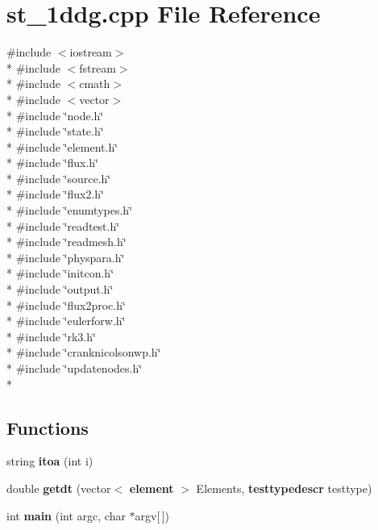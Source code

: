 \section{st\-\_\-1ddg.\-cpp File Reference}
\label{st__1ddg_8cpp}
{\ttfamily \#include $<$iostream$>$}\\*
{\ttfamily \#include $<$fstream$>$}\\*
{\ttfamily \#include $<$cmath$>$}\\*
{\ttfamily \#include $<$vector$>$}\\*
{\ttfamily \#include \char`\"{}node.\-h\char`\"{}}\\*
{\ttfamily \#include \char`\"{}state.\-h\char`\"{}}\\*
{\ttfamily \#include \char`\"{}element.\-h\char`\"{}}\\*
{\ttfamily \#include \char`\"{}flux.\-h\char`\"{}}\\*
{\ttfamily \#include \char`\"{}source.\-h\char`\"{}}\\*
{\ttfamily \#include \char`\"{}flux2.\-h\char`\"{}}\\*
{\ttfamily \#include \char`\"{}enumtypes.\-h\char`\"{}}\\*
{\ttfamily \#include \char`\"{}readtest.\-h\char`\"{}}\\*
{\ttfamily \#include \char`\"{}readmesh.\-h\char`\"{}}\\*
{\ttfamily \#include \char`\"{}physpara.\-h\char`\"{}}\\*
{\ttfamily \#include \char`\"{}initcon.\-h\char`\"{}}\\*
{\ttfamily \#include \char`\"{}output.\-h\char`\"{}}\\*
{\ttfamily \#include \char`\"{}flux2proc.\-h\char`\"{}}\\*
{\ttfamily \#include \char`\"{}eulerforw.\-h\char`\"{}}\\*
{\ttfamily \#include \char`\"{}rk3.\-h\char`\"{}}\\*
{\ttfamily \#include \char`\"{}cranknicolsonwp.\-h\char`\"{}}\\*
{\ttfamily \#include \char`\"{}updatenodes.\-h\char`\"{}}\\*
\subsection*{Functions}
\begin{DoxyCompactItemize}
\item 
string {\bf itoa} (int i)
\item 
double {\bf getdt} (vector$<$ {\bf element} $>$ Elements, {\bf testtypedescr} testtype)
\item 
int {\bf main} (int argc, char $\ast$argv[$\,$])
\end{DoxyCompactItemize}


